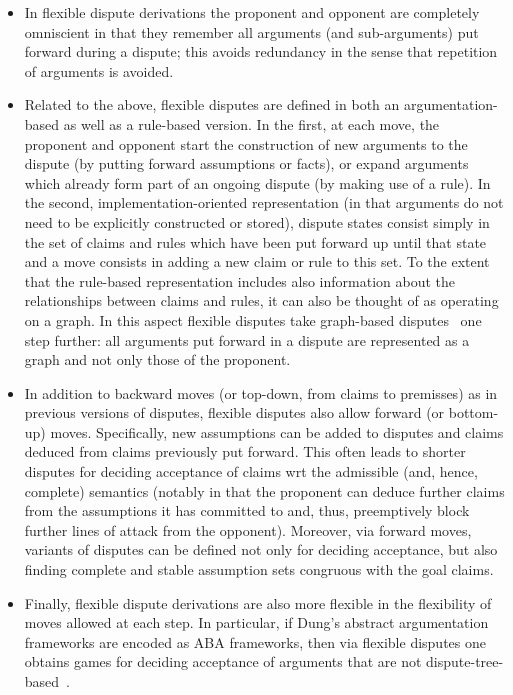 \documentclass[conference]{IEEEtran}
\begin{document}
\begin{itemize}
\item In flexible dispute derivations the proponent and opponent are completely omniscient in that they remember all arguments (and sub-arguments) put forward during a dispute; this avoids redundancy in the sense that repetition of arguments is avoided.    
\item Related to the above, flexible disputes are defined in both an argumentation-based as well as a rule-based version.  In the first, at each move, the proponent and opponent start the construction of new arguments to the dispute (by putting forward assumptions or facts), or expand arguments which already form part of an ongoing dispute (by making use of a rule).  In the second, implementation-oriented representation (in that arguments do not need to be explicitly constructed or stored), dispute states consist simply in the set of claims and rules which have been put forward up until that state and a move consists in adding a new claim or rule to this set.   To the extent that the rule-based representation includes also information about the relationships between claims and rules, it can also be thought of as operating on a graph.  In this aspect flexible disputes take graph-based disputes~\cite{CravenT16} one step further: all arguments put forward in a dispute are represented as a graph and not only those of the proponent.
\item In addition to backward moves (or top-down, from claims to premisses) as in previous versions of disputes, flexible disputes also allow forward (or bottom-up) moves.  Specifically, new assumptions can be added to disputes and claims deduced from claims previously put forward.  This often leads to shorter disputes for deciding acceptance of claims wrt the admissible (and, hence, complete) semantics (notably in that the proponent can deduce further claims from the assumptions it has committed to and, thus, preemptively block further lines of attack from the opponent). Moreover, via forward moves, variants of disputes can be defined not only for deciding acceptance, but also finding complete and stable assumption sets congruous with the goal claims.
\item Finally, flexible dispute derivations are also more flexible in the flexibility of moves allowed at each step.  In particular, if Dung's abstract argumentation frameworks are encoded as ABA frameworks, then via flexible disputes one obtains games for deciding acceptance of arguments that are not dispute-tree-based~\cite{Caminada18}.
\end{itemize}
\end{document}
